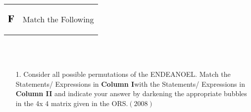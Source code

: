 \documentclass[journal,12pt,twocolumn]{IEEEtran}
\theoremstyle{remark}
\begin{document}
\newpage
\onecolumn
\begin{tabular}{p{1.5cm}p{10cm}}
   $\Large \textbf{F} $  &   \begin{Large}
   Match the Following 
   \end{Large}   
\end{tabular} \\ \\
\noindent



\begin{enumerate}
    \item[1. ] Consider all possible permutations of the ENDEANOEL. Match the Statements/ Expressions in
\textbf{Column I}with the Statements/ Expressions in \textbf{Column II} and indicate your answer by darkening
the appropriate bubbles in the 4x 4 matrix given in the ORS.\hfill $(2008)$\\  
    
\end{enumerate}
\end{document}
